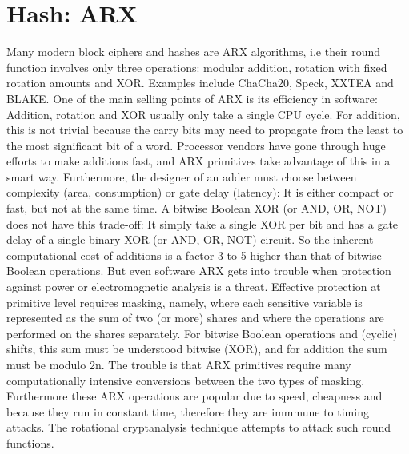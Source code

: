 \documentclass{article}
\begin{document}
\section{Hash: ARX}
Many modern block ciphers and hashes are ARX algorithms, i.e their round function involves only three operations: modular addition, rotation with fixed rotation amounts and XOR. Examples include ChaCha20, Speck, XXTEA and BLAKE.
\newline One of the main selling points of ARX is its efficiency in software: Addition, rotation and XOR usually only take a single CPU cycle. For addition, this is not trivial because the carry bits may need to propagate from the least to the most significant bit of a word. Processor vendors have gone through huge efforts to make additions fast, and ARX primitives take advantage of this in a smart way.
Furthermore, the designer of an adder must choose between complexity (area, consumption) or gate delay (latency): It is either compact or fast, but not at the same time. A bitwise Boolean XOR (or AND, OR, NOT) does not have this trade-off: It simply take a single XOR per bit and has a gate delay of a single binary XOR (or AND, OR, NOT) circuit. So the inherent computational cost of additions is a factor 3 to 5 higher than that of bitwise Boolean operations.
\newline But even software ARX gets into trouble when protection against power or electromagnetic analysis is a threat. Effective protection at primitive level requires masking, namely, where each sensitive variable is represented as the sum of two (or more) shares and where the operations are performed on the shares separately. For bitwise Boolean operations and (cyclic) shifts, this sum must be understood bitwise (XOR), and for addition the sum must be modulo 2n. The trouble is that ARX primitives require many computationally intensive conversions between the two types of masking.
\newline Furthermore these ARX operations are popular due to speed, cheapness and because they run in constant time, therefore they are immmune to timing attacks. The rotational cryptanalysis technique attempts to attack such round functions.
\end{document}
